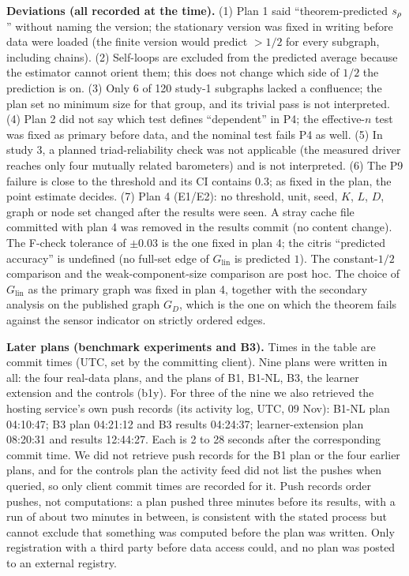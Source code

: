 \textbf{Deviations (all recorded at the time).} (1) Plan 1 said
``theorem-predicted $s_\rho$'' without naming the version; the stationary
version was fixed in writing before data were loaded (the finite version would
predict $>1/2$ for every subgraph, including chains). (2) Self-loops are
excluded from the predicted average because the estimator cannot orient
them; this does not change which side of $1/2$ the prediction is on.
(3) Only 6 of 120 study-1 subgraphs lacked a confluence; the plan set no
minimum size for that group, and its trivial pass is not interpreted. (4) Plan
2 did not say which test defines ``dependent'' in P4; the effective-$n$ test
was fixed as primary before data, and the nominal test fails P4 as well.
(5) In study 3, a planned triad-reliability check was not applicable (the
measured driver reaches only four mutually related barometers) and is not
interpreted. (6) The P9 failure is close to the threshold and its CI contains
$0.3$; as fixed in the plan, the point estimate decides.
(7) Plan 4 (E1/E2): no threshold, unit, seed, $K$, $L$, $D$, graph or node set
changed after the results were seen. A stray cache file committed with plan 4 was removed in the results
commit (no content change). The F-check tolerance of $\pm0.03$ is the one fixed in plan 4; the citris
``predicted accuracy'' is undefined (no full-set edge of $G_{\mathrm{lin}}$ is predicted $1$). The
constant-$1/2$ comparison and the weak-component-size comparison are post hoc. The choice of $G_{\mathrm{lin}}$ as the primary graph was
fixed in plan 4, together with the secondary analysis on the published graph $G_D$, which is the one on which
the theorem fails against the sensor indicator on strictly ordered edges.

\textbf{Later plans (benchmark experiments and B3).} Times in the table are
commit times (UTC, set by the committing client). Nine plans were written in
all: the four real-data plans, and the plans of B1, B1-NL, B3, the learner
extension and the controls (b1y). For three of the nine we also
retrieved the hosting service's own push records (its activity log, UTC, 09
Nov): B1-NL plan 04:10:47; B3 plan 04:21:12 and B3 results 04:24:37;
learner-extension plan 08:20:31 and results 12:44:27. Each is 2 to 28 seconds
after the corresponding commit time. We did not retrieve push records for the
B1 plan or the four earlier plans, and for the controls plan the activity feed
did not list the pushes when queried, so only client commit times are recorded
for it. Push records order pushes, not
computations: a plan pushed three minutes before its results, with a run of
about two minutes in between, is consistent with the stated process but cannot
exclude that something was computed before the plan was written. Only
registration with a third party before data access could, and no plan was
posted to an external registry.

